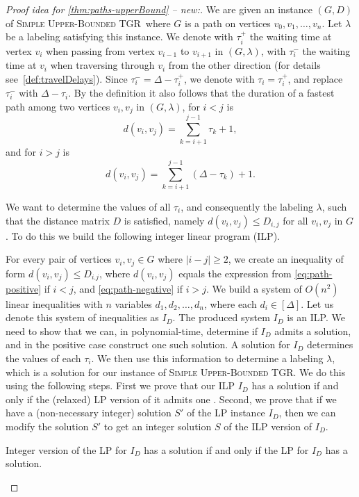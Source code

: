 \documentclass[a4paper,UKenglish,cleveref, autoref, thm-restate]{lipics-v2021}
\newcommand{\deltaUpperBound}{\textsc{Simple Upper-Bounded TGR}}
\begin{document}
\begin{proof}[Proof idea for \cref{thm:paths-upperBound} -- new:]
We are given an instance  $(G,D)$ of \deltaUpperBound\, where $G$ is a path on vertices $v_0, v_1, \dots, v_n$. 
Let $\lambda$ be a labeling satisfying this instance.
We denote with $\tau_i^+$ the waiting time at vertex $v_i$ when passing from vertex $v_{i-1}$ to $v_{i+1}$ in $(G,\lambda)$, with $\tau_i^-$ the waiting time at $v_i$ when traversing through $v_i$ from the other direction (for details see~\cref{def:travelDelays}).
Since $\tau_i^- = \Delta - \tau_i^+$, we denote with $\tau_i = \tau_i^+$, and replace $\tau_i^-$ with $ \Delta - \tau_i$.
By the definition it also follows that the duration of a fastest path among two vertices $v_i, v_j$ in $(G,\lambda)$, for $i < j$
is 
\begin{equation}\label{eq:path-positive}
    d(v_i,v_j)=\sum_{k = i+1}^{j-1} \tau_k + 1,
\end{equation}
and for $i > j$ is 
\begin{equation}\label{eq:path-negative}
d(v_i,v_j)=\sum_{k = i+1}^{j-1} (\Delta - \tau_k) + 1.
\end{equation}

We want to determine the values of all $\tau_i$, and consequently the labeling $\lambda$, such that the distance matrix $D$ is satisfied,
namely $d(v_i,v_j) \leq D_{i,j}$ for all $v_i,v_j$ in $G$.
To do this we build the following integer linear program (ILP).

For every pair of vertices $v_i, v_j \in G$ where $|i-j| \geq 2$, we create an inequality of form $d(v_i,v_j) \leq D_{i.j}$, where $d(v_i,v_j)$ equals the expression from \cref{eq:path-positive} if $i < j$, and \cref{eq:path-negative} if $i > j$.
We build a system of $O(n^2)$ linear inequalities with $n$ variables $d_1,d_2, \dots, d_n$,
where each $d_i \in [\Delta]$. Let us denote this system of inequalities as $I_D$.
The produced system $I_D$ is an ILP. 
We need to show that we can, in polynomial-time, determine if $I_D$ admits a solution,
and in the positive case construct one such solution.
A solution for $I_D$ determines the values of each $\tau_i$. We then use this information to determine a labeling $\lambda$, which is a solution for our instance of \deltaUpperBound.
We do this using the following steps.
First we prove that our ILP $I_D$ has a solution if and only if the (relaxed) LP version of it admits one .
Second, we prove that if we have a (non-necessary integer) solution $S'$ of the LP instance $I_D$, then we can modify the solution $S'$ to get an integer solution $S$ of the ILP version of $I_D$.
\begin{claim}
    Integer version of the LP for $I_D$ has a solution if and only if the LP for $I_D$ has a solution.
\end{claim}


\end{proof}
\end{document}
